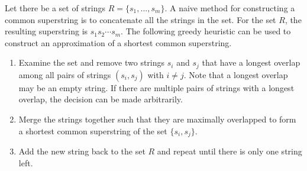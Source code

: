 \documentclass[english,twoside,censored,csm,algorithms-track-2020]{HYthesisML}
\theoremstyle{plain}
\theoremstyle{definition}
\begin{document}
  

Let there be a set of strings $R=\{s_1,...,s_m\}$. A naive method for constructing a common superstring
is to concatenate all the strings in the set. For the set $R$, the resulting superstring
is $s_1s_2\cdots s_m$.
The following greedy heuristic can be used to construct an approximation of a shortest
common superstring.

\begin{enumerate}
\item Examine the set and remove two strings $s_i$ and $s_j$ that have a longest overlap among all pairs of strings $(s_i, s_j)$ with $i\neq j$. Note that a longest overlap may be an empty string. If there are multiple pairs of strings with a longest overlap, the decision can be made arbitrarily.
\item Merge the strings together such that they are maximally overlapped to form a shortest common superstring of the set $\{s_i, s_j\}$.
  \item Add the new string back to the set $R$ and repeat until there is only one string left.
\end{enumerate}
\end{document}
